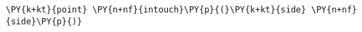 \begin{Verbatim}[commandchars=\\\{\}]
    \PY{k+kt}{point} \PY{n+nf}{intouch}\PY{p}{(}\PY{k+kt}{side} \PY{n+nf}{side}\PY{p}{)}
\end{Verbatim}
